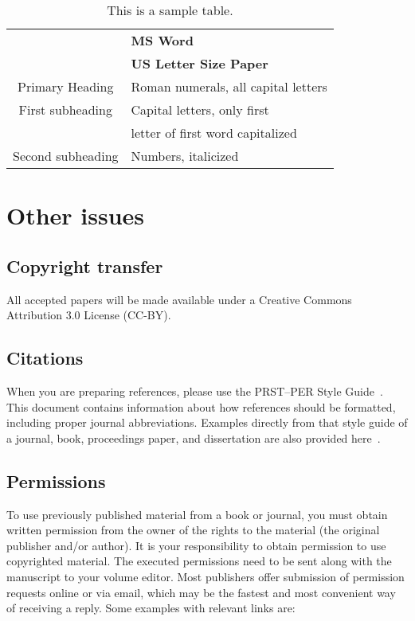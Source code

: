 \documentclass[english,aps,pra,reprint,noshowpacs,superscriptaddress]{revtex4-1}
\begin{document}
\begin{table}[htbp]
\caption{This is a sample table.\label{tab1}}
\begin{ruledtabular}
\begin{tabular}{cl}
 & \textbf{MS Word} \\
 & \textbf{US Letter Size Paper} \\
 \hline
Primary Heading & Roman numerals, all capital letters \\
First subheading & Capital letters, only first \\
 & letter of first word capitalized \\
Second subheading & Numbers, italicized 
\end{tabular}
\end{ruledtabular}
\end{table}


\section{Other issues}

\subsection{Copyright transfer}
All accepted papers will be made available under a Creative Commons Attribution 3.0 License (CC-BY).

\subsection{Citations}
When you are preparing references, please use the PRST--PER Style
Guide~\cite{style-guide}.  This document contains information about
how references should be formatted, including proper journal
abbreviations.  Examples directly from that style guide of a journal,
book, proceedings paper, and dissertation are also provided
here~\cite{smith-brown,smith,smith-proc,smith-diss}.

\subsection{Permissions}
To use previously published material from a book or journal, you must
obtain written permission from the owner of the rights to the material
(the original publisher and/or author). It is your responsibility to
obtain permission to use copyrighted material. The executed
permissions need to be sent along with the manuscript to your volume
editor. Most publishers offer submission of permission requests online
or via email, which may be the fastest and most convenient way of
receiving a reply. Some examples with relevant links are:
\end{document}

